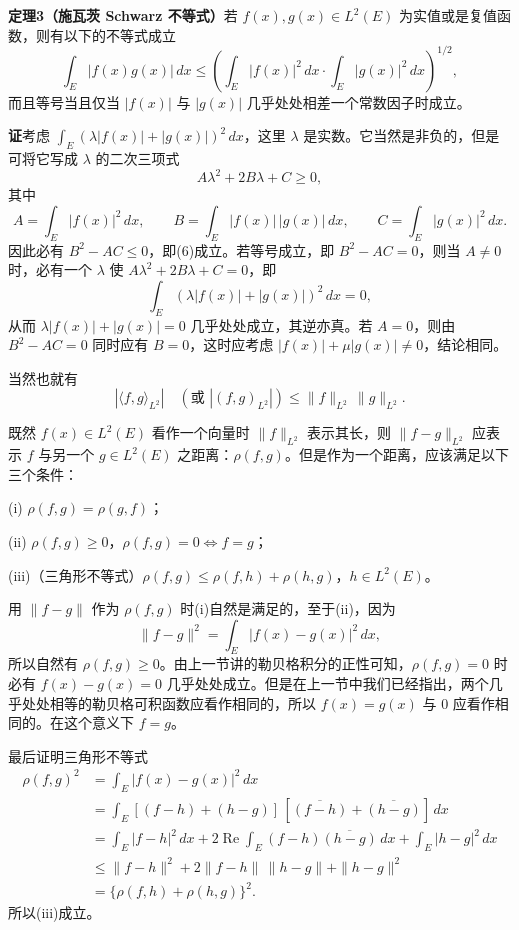 \noindent\textbf{定理3（施瓦茨 Schwarz 不等式）}\quad 若 $f(x),g(x)\in L^2(E)$ 为实值或是复值函数，则有以下的不等式成立
\begin{equation}
 \int_E|f(x)g(x)|\,dx\le\left(\int_E|f(x)|^2\,dx\cdot\int_E|g(x)|^2\,dx\right)^{1/2},
 \tag{6}
\end{equation}
而且等号当且仅当 $|f(x)|$ 与 $|g(x)|$ 几乎处处相差一个常数因子时成立。

\noindent\textbf{证}\quad 考虑 $\int_E(\lambda|f(x)|+|g(x)|)^2\,dx$，这里 $\lambda$ 是实数。它当然是非负的，但是可将它写成 $\lambda$ 的二次三项式
\[
 A\lambda^2+2B\lambda+C\ge0,
\]
其中
\[
 A=\int_E|f(x)|^2\,dx,\qquad B=\int_E|f(x)|\,|g(x)|\,dx,\qquad C=\int_E|g(x)|^2\,dx.
\]
因此必有 $B^2-AC\le0$，即(6)成立。若等号成立，即 $B^2-AC=0$，则当 $A\ne0$ 时，必有一个 $\lambda$ 使 $A\lambda^2+2B\lambda+C=0$，即
\[
 \int_E(\lambda|f(x)|+|g(x)|)^2\,dx=0,
\]
从而 $\lambda|f(x)|+|g(x)|=0$ 几乎处处成立，其逆亦真。若 $A=0$，则由 $B^2-AC=0$ 同时应有 $B=0$，这时应考虑 $|f(x)|+\mu|g(x)|\ne0$，结论相同。

当然也就有
\begin{equation}
 |\langle f,g\rangle_{L^2}|\quad(\text{或 }|(f,g)_{L^2}|)\le\|f\|_{L^2}\,\|g\|_{L^2}.
 \tag{7}
\end{equation}

既然 $f(x)\in L^2(E)$ 看作一个向量时 $\|f\|_{L^2}$ 表示其长，则 $\|f-g\|_{L^2}$ 应表示 $f$ 与另一个 $g\in L^2(E)$ 之距离：$\rho(f,g)$。但是作为一个距离，应该满足以下三个条件：

(i) $\rho(f,g)=\rho(g,f)$；

(ii) $\rho(f,g)\ge0$，$\rho(f,g)=0\Leftrightarrow f=g$；

(iii)（三角形不等式）$\rho(f,g)\le\rho(f,h)+\rho(h,g)$，$h\in L^2(E)$。

用 $\|f-g\|$ 作为 $\rho(f,g)$ 时(i)自然是满足的，至于(ii)，因为
\[
 \|f-g\|^2=\int_E|f(x)-g(x)|^2\,dx,
\]
所以自然有 $\rho(f,g)\ge0$。由上一节讲的勒贝格积分的正性可知，$\rho(f,g)=0$ 时必有 $f(x)-g(x)=0$ 几乎处处成立。但是在上一节中我们已经指出，两个几乎处处相等的勒贝格可积函数应看作相同的，所以 $f(x)=g(x)$ 与 $0$ 应看作相同的。在这个意义下 $f=g$。

最后证明三角形不等式
\[
\begin{aligned}
 \rho(f,g)^2
 &=\int_E|f(x)-g(x)|^2\,dx\\
 &=\int_E[(f-h)+(h-g)]\,[\overline{(f-h)}+\overline{(h-g)}] \,dx\\
 &=\int_E|f-h|^2\,dx+2\operatorname{Re}\int_E(f-h)\overline{(h-g)}\,dx+\int_E|h-g|^2\,dx\\
 &\le \|f-h\|^2+2\|f-h\|\,\|h-g\|+\|h-g\|^2\\
 &=\{\rho(f,h)+\rho(h,g)\}^2.
\end{aligned}
\]
所以(iii)成立。

